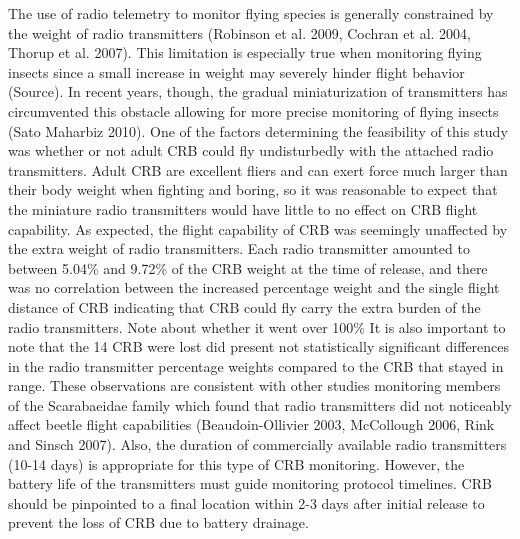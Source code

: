 \documentclass[11pt,letterpaper]{scrartcl}
\begin{document}
The use of radio telemetry to monitor flying species is generally constrained by the weight of radio transmitters (Robinson et al. 2009, Cochran et al. 2004, Thorup et al. 2007). This limitation is especially true when monitoring flying insects since a small increase in weight may severely hinder flight behavior (Source). In recent years, though, the gradual miniaturization of transmitters has circumvented this obstacle allowing for more precise monitoring of flying insects (Sato Maharbiz 2010). One of the factors determining the feasibility of this study was whether or not adult CRB could fly undisturbedly with the attached radio transmitters. Adult CRB are excellent fliers and can exert force much larger than their body weight when fighting and boring, so it was reasonable to expect that the miniature radio transmitters would have little to no effect on CRB flight capability. As expected, the flight capability of CRB was seemingly unaffected by the extra weight of radio transmitters.  Each radio transmitter amounted to between 5.04\% and 9.72\% of the CRB weight at the time of release, and there was no correlation between the increased percentage weight and the single flight distance of CRB indicating that CRB could fly carry the extra burden of the radio transmitters. Note about whether it went over 100\% It is also important to note that the 14 CRB were lost did present not statistically significant differences in the radio transmitter percentage weights compared to the CRB that stayed in range. These observations are consistent with other studies monitoring members of the Scarabaeidae family which found that radio transmitters did not noticeably affect beetle flight capabilities (Beaudoin-Ollivier 2003, McCollough 2006, Rink and Sinsch 2007). Also, the duration of commercially available radio transmitters (10-14 days) is appropriate for this type of CRB monitoring. However, the battery life of the transmitters must guide monitoring protocol timelines. CRB should be pinpointed to a final location within 2-3 days after initial release to prevent the loss of CRB due to battery drainage. 
\end{document}
